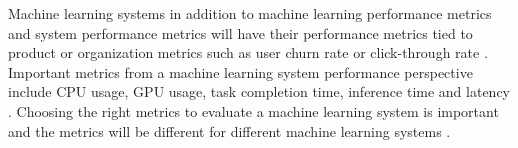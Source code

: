 Machine learning systems in addition to machine learning performance metrics and system performance metrics will have their performance metrics tied to product or organization metrics such as user churn rate or click-through rate \parencite{shankarOperationalizingMachineLearning2022}. Important metrics from a machine learning system performance perspective include CPU usage, GPU usage, task completion time, inference time and latency \parencite{cardososilvaBenchmarkingMachineLearning2020}. Choosing the right metrics to evaluate a machine learning system is important and the metrics will be different for different machine learning systems \parencite{shankarOperationalizingMachineLearning2022}.